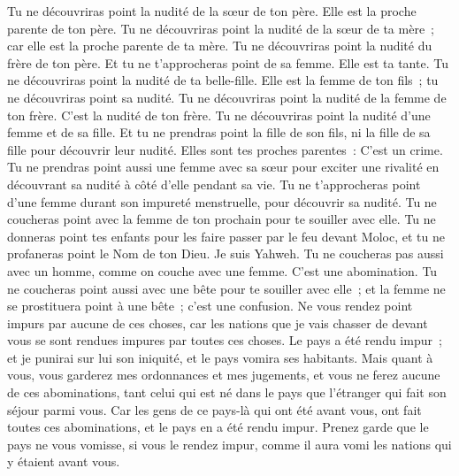 \begin{multicols}{2}
Tu ne découvriras point la nudité de la sœur de ton père. Elle est la proche parente de ton père.
Tu ne découvriras point la nudité de la sœur de ta mère~; car elle est la proche parente de ta mère.
Tu ne découvriras point la nudité du frère de ton père. Et tu ne t'approcheras point de sa femme. Elle est ta tante.
Tu ne découvriras point la nudité de ta belle-fille. Elle est la femme de ton fils~; tu ne découvriras point sa nudité.
Tu ne découvriras point la nudité de la femme de ton frère. C'est la nudité de ton frère.
Tu ne découvriras point la nudité d'une femme et de sa fille. Et tu ne prendras point la fille de son fils, ni la fille de sa fille pour découvrir leur nudité. Elles sont tes proches parentes~: C'est un crime.
Tu ne prendras point aussi une femme avec sa sœur pour exciter une rivalité en découvrant sa nudité à côté d'elle pendant sa vie.
Tu ne t'approcheras point d'une femme durant son impureté menstruelle, pour découvrir sa nudité.
Tu ne coucheras point avec la femme de ton prochain pour te souiller avec elle.
Tu ne donneras point tes enfants pour les faire passer par le feu devant Moloc, et tu ne profaneras point le Nom de ton Dieu. Je suis Yahweh.
Tu ne coucheras pas aussi avec un homme, comme on couche avec une femme. C'est une abomination.
Tu ne coucheras point aussi avec une bête pour te souiller avec elle~; et la femme ne se prostituera point à une bête~; c'est une confusion.
Ne vous rendez point impurs par aucune de ces choses, car les nations que je vais chasser de devant vous se sont rendues impures par toutes ces choses.
Le pays a été rendu impur~; et je punirai sur lui son iniquité, et le pays vomira ses habitants.
Mais quant à vous, vous garderez mes ordonnances et mes jugements, et vous ne ferez aucune de ces abominations, tant celui qui est né dans le pays que l'étranger qui fait son séjour parmi vous.
Car les gens de ce pays-là qui ont été avant vous, ont fait toutes ces abominations, et le pays en a été rendu impur.
Prenez garde que le pays ne vous vomisse, si vous le rendez impur, comme il aura vomi les nations qui y étaient avant vous.

\end{multicols}

